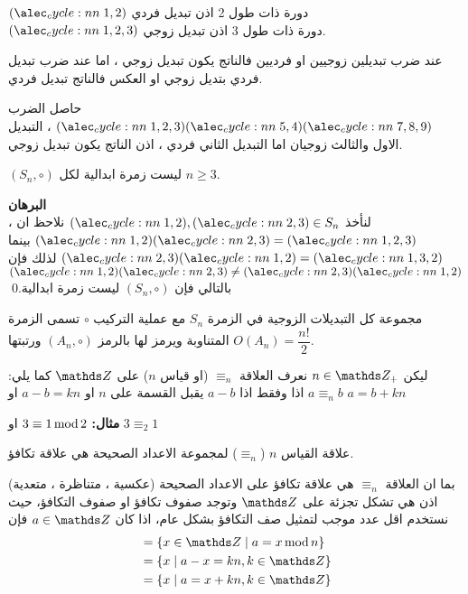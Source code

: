 \begin{example}
	$\cycle{1,2}$ دورة ذات طول 2 اذن تبديل فردي\\
	$\cycle{1,2,3}$ دورة ذات طول 3 اذن تبديل زوجي.
\end{example}

\begin{theorem}
	عند ضرب تبديلين زوجيين او فرديين فالناتج يكون تبديل زوجي ، اما عند ضرب تبديل فردي بتديل زوجي او العكس فالناتج تبديل فردي.
\end{theorem}

\begin{example}
	حاصل الضرب $\cycle{1,2,3} \cycle{5,4}\cycle{7,8,9}$ ، التبديل الاول والثالث زوجيان اما التبديل الثاني فردي ، اذن الناتج يكون تبديل زوجي.
\end{example}

\begin{lemma}
	$(S_n, \circ)$ ليست زمرة ابدالية لكل $n\geq 3$.
\end{lemma}
\noindent
\textbf{البرهان}\\
\noindent
لنأخذ $\cycle{1,2}, \cycle{2,3} \in S_n$ نلاحظ ان ، 
$\cycle{1,2}\cycle{2,3} = \cycle{1,2,3}$ بينما
$\cycle{2,3}\cycle{1,2} = \cycle{1,3,2}$
لذلك فإن 
$\cycle{1,2}\cycle{2,3} \neq\cycle{2,3}\cycle{1,2}$
بالتالي فإن $(S_n , \circ)$ ليست زمرة ابدالية.\qed

\begin{definition}
	مجموعة كل التبديلات الزوجية في الزمرة $S_n$ مع عملية التركيب $\circ$ تسمى الزمرة المتناوبة ويرمز لها بالرمز $(A_n, \circ)$ ورتبتها $O(A_n) = \dfrac{n!}{2}$.
\end{definition}


\begin{definition}
	ليكن $n\in \Z_+$ نعرف العلاقة $\equiv_n$ (او قياس $n$) على $\Z$ كما يلي: $a\equiv_n b$ اذا وفقط اذا $a-b$ يقبل القسمة على $n$ او $a-b = kn$ او $a=b+kn$
\end{definition}
\noindent\textbf{مثال:} $3\equiv1\operatorname{mod} 2$ او $3\equiv_2 1$

\begin{theorem}
	علاقة القياس $n$ ($\equiv_n$) لمجموعة الاعداد الصحيحة هي علاقة تكافؤ.
\end{theorem}

\begin{note}
	بما ان العلاقة $\equiv_n$ هي علاقة تكافؤ على الاعداد الصحيحة (عكسية ، متناظرة ، متعدية) اذن هي تشكل تجزئة على $\Z$ وتوجد صفوف تكافؤ او صفوف التكافؤ، حيث نستخدم اقل عدد موجب لتمثيل صف التكافؤ بشكل عام، اذا كان $a\in \Z$ فإن
	\begin{align*}
			[a] &= \{x\in \Z \mid a=x\Mod n\}\\
			&= \{x\mid a-x = kn, k\in \Z\}\\
			&= \{x\mid a = x + kn, k\in \Z \}
	\end{align*}
\end{note}

